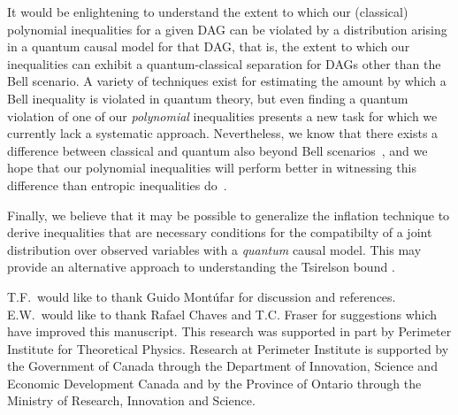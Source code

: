 It would be enlightening to understand the extent to which our (classical) polynomial inequalities for a given DAG can be violated by a distribution arising in a quantum causal model for that DAG, that is, the extent to which our inequalities can exhibit  a quantum-classical separation for DAGs other than the Bell scenario.  A variety of techniques exist for estimating the amount by which a Bell inequality \cite{NPA2008Long,I3322NPA1} is violated in quantum theory, but even finding a quantum violation of one of our \emph{polynomial} inequalities presents a new task for which we currently lack a systematic approach. Nevertheless, we know that there exists a difference between classical and quantum also beyond Bell scenarios~\cite[Theorem~2.16]{fritz2012bell}, and we hope that our polynomial inequalities will perform better in witnessing this difference than entropic inequalities do~\cite{pusey2014gdag,Chaves2015infoquantum}.

Finally, we believe that it may be possible to generalize the inflation technique to derive inequalities that are necessary conditions for the compatibilty of a joint distribution over observed variables with a {\em quantum} causal model.  This may provide an alternative approach to understanding the Tsirelson bound \cite{Brunner2013Bell}.







\begin{acknowledgments}
T.F.~would like to thank Guido Mont\'ufar for discussion and references. E.W.~would like to thank Rafael Chaves and T.C. Fraser for suggestions which have improved this manuscript. This research was supported in part by Perimeter Institute for Theoretical Physics. Research at Perimeter Institute is supported by the Government of Canada through the Department of Innovation, Science and Economic Development Canada and by the Province of Ontario through the Ministry of Research, Innovation and Science.
\end{acknowledgments}


